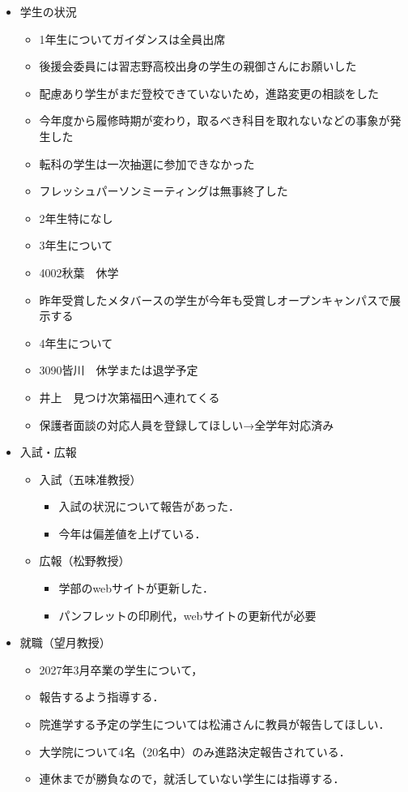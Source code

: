 \documentclass[10.5pt,a4paper]{jsarticle}
\begin{document}
\begin{enumerate}[label=\arabic*：, leftmargin=2zw, labelsep=1zw, itemsep=1\baselineskip]
\begin{itemize}[label=・, leftmargin=1.5zw, itemsep=1\baselineskip]
		\item 学生の状況
		\begin{itemize}[label=-, leftmargin=2zw, nosep]
			\item 1年生についてガイダンスは全員出席
			\item 後援会委員には習志野高校出身の学生の親御さんにお願いした
			\item 配慮あり学生がまだ登校できていないため，進路変更の相談をした
			\item 今年度から履修時期が変わり，取るべき科目を取れないなどの事象が発生した
			\item 転科の学生は一次抽選に参加できなかった
			\item フレッシュパーソンミーティングは無事終了した
			\item 2年生特になし
			\item 3年生について
			\item 4002秋葉　休学
			\item 昨年受賞したメタバースの学生が今年も受賞しオープンキャンパスで展示する
			\item 4年生について
			\item 3090皆川　休学または退学予定
			\item 井上　見つけ次第福田へ連れてくる
			\item 保護者面談の対応人員を登録してほしい→全学年対応済み
		\end{itemize}

		\item 入試・広報
		\begin{itemize}[label=-, leftmargin=2zw, nosep]
			\item 入試（五味准教授）
				\begin{itemize}
					\item 入試の状況について報告があった．
					\item 今年は偏差値を上げている．
				\end{itemize}
			\item 広報（松野教授）
				\begin{itemize}
				\item 学部のwebサイトが更新した．
				\item パンフレットの印刷代，webサイトの更新代が必要
			\end{itemize}
		\end{itemize}

		\item 就職（望月教授）
		\begin{itemize}[label=-, leftmargin=2zw, nosep]
			\item 2027年3月卒業の学生について，
			\item 報告するよう指導する．
			\item 院進学する予定の学生については松浦さんに教員が報告してほしい．
			\item 大学院について4名（20名中）のみ進路決定報告されている．
			\item 連休までが勝負なので，就活していない学生には指導する．
		\end{itemize}


\end{itemize}
\end{enumerate}
\end{document}
